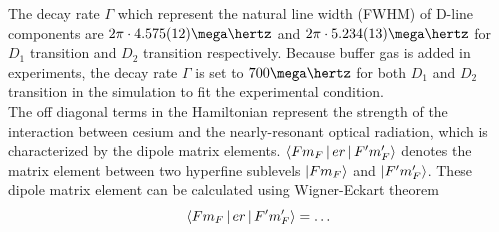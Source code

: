 \documentclass[11pt,a4paper]{article}
\begin{document}
The decay rate $\Gamma$ which represent the natural line width (FWHM) of D-line components are $2\pi \cdot 4.575(12) \mega\hertz$ and $2\pi \cdot 5.234(13) \mega\hertz$ for $D_1$ transition and $D_2$ transition respectively. Because buffer gas is added in experiments, the decay rate $\Gamma$ is set to $700 \mega\hertz$ for both $D_1$ and $D_2$ transition in the simulation to fit the experimental condition.\\

The off diagonal terms in the Hamiltonian represent the strength of the interaction between cesium and the nearly-resonant optical radiation, which is characterized by the dipole matrix elements. $\Braket{F m_F | er | F^{\prime} m_F^{\prime}}$ denotes the matrix element between two hyperfine sublevels $\ket{ F m_F }$ and $\ket{ F^{\prime} m_F^{\prime}}$. These dipole matrix element can be calculated using Wigner-Eckart theorem
\begin{equation}
  \Braket{ F m_F | er | F^{\prime} m_F^{\prime}} =\dots
\end{equation}
\end{document}

